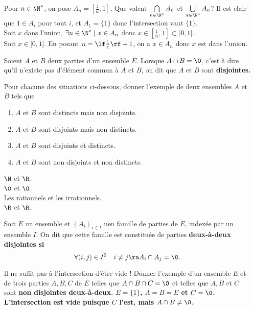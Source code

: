 \documentclass[11pt]{article}
\begin{document}
\begin{ex}{}{}
    Pour $n\in\N^*$, on pose $A_n=[\frac{1}{n},1]$. Que valent $\bigcap\limits_{n\in\N^*}A_n$ et $\bigcup\limits_{n\in\N^*}A_n$?
    \tcblower
    Il est clair que $1\in A_i$ pour tout $i$, et $A_1=\{1\}$ donc l'intersection vaut $\{1\}$.\\
    Soit $x$ dans l'union, $\exists n\in \N^*\mid x\in A_n$ donc $x\in[\frac{1}{n},1]\subset]0,1]$.\\
    Soit $x\in ]0,1]$. En posant $n=\lf \frac{1}{x} \rf + 1$, on a $x\in A_n$ donc $x$ est dans l'union.
\end{ex}

\begin{defi}{}{}
    Soient $A$ et $B$ deux parties d'un ensemble $E$. Lorsque $A\cap B=\0$, c'est à dire qu'il n'existe pas d'élément commun à $A$ et $B$, on dit que $A$ et $B$ sont \bf{disjointes}. 
\end{defi}

\begin{ex}{}{}
    Pour chacune des situations ci-dessous, donner l'exemple de deux ensembles $A$ et $B$ tels que
    \begin{enumerate}
        \item $A$ et $B$ sont distincts mais non disjoints.
        \item $A$ et $B$ sont disjoints mais non distincts.
        \item $A$ et $B$ sont disjoints et distincts.
        \item $A$ et $B$ sont non disjoints et non distincts.
    \end{enumerate}
    \tcblower
     $\N$ et $\R$.\\
     $\0$ et $\0$.\\
     Les rationnels et les irrationnels.\\
     $\R$ et $\R$.
\end{ex}

\begin{defi}{}{}
    Soit $E$ un ensemble et $(A_i)_{i\in I}$ uen famille de parties de $E$, indexée par un ensemble $I$. On dit que cette famille est constituée de parties \bf{deux-à-deux disjointes} si
    \begin{equation*}
        \forall(i,j)\in I^2\quad i\neq j \ra A_i\cap A_j = \0.
    \end{equation*}
\end{defi}

\begin{ex}{Il ne suffit pas à l'intersection d'être vide !}{}
    Donner l'exemple d'un ensemble $E$ et de trois parties $A,B,C$ de $E$ telles que $A\cap B\cap C=\0$ et telles que $A,B$ et $C$ sont \bf{non disjointes deux-à-deux}.
    \tcblower
    $E=\{1\}$, $A=B=E$ et $C=\0$. L'intersection est vide puisque $C$ l'est, mais $A\cap B\neq\0$.
\end{ex}
\end{document}

